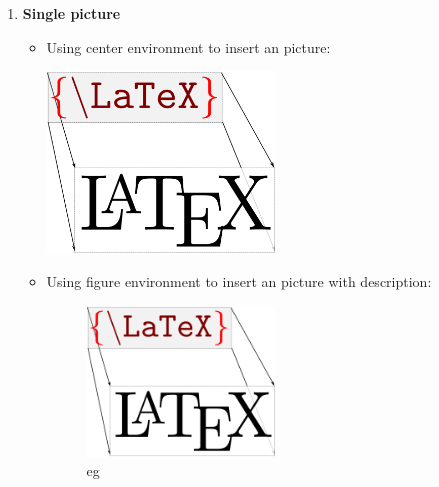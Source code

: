 \begin{solution}
    \begin{enumerate}[nosep,label=(\arabic*)]
        \item \textbf{Single picture} \\
            \begin{itemize}
            \item Using center environment to insert an picture: \\
\begin{latexample}[]
\begin{center}
  \includegraphics[width=0.5\textwidth]{./pic/latex.png}
\end{center}
\end{latexample}
            \item Using figure environment to insert an picture with description: \\
\begin{latexample}[]
\begin{figure}[H]
  \centering
  \includegraphics[width=0.5\textwidth]{./pic/latex.png}
  \caption{eg}
\end{figure}
\end{latexample}
            \end{itemize}


\end{enumerate}
\end{solution}
